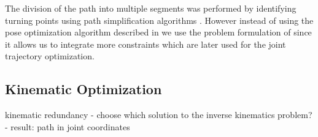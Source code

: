 \documentclass[5p,times,procedia]{elsarticle}
\begin{document}
The division of the path into multiple segments was performed by identifying turning points using path simplification algorithms \cite{stroke_division}.
However instead of using the pose optimization algorithm described in \cite{stroke_division} we use the problem formulation of \cite{previous_work} since it allows us to integrate more constraints which are later used for the joint trajectory optimization.



\subsection{Kinematic Optimization}
kinematic redundancy - choose which solution to the inverse kinematics problem?
- result: path in joint coordinates
\end{document}
